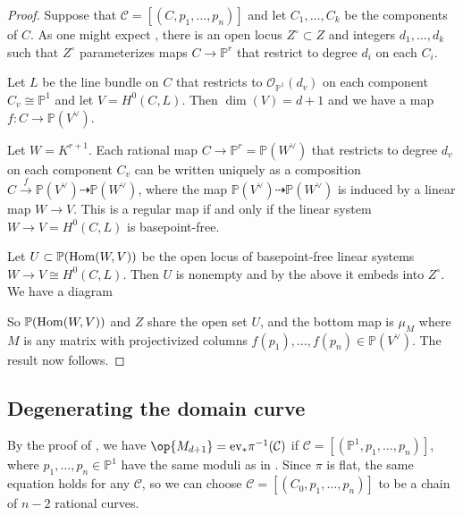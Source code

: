 \documentclass[12pt]{amsart}
\newcommand{\mb}{\mathbb}
\newcommand{\mc}{\mathcal}
\newcommand{\ms}{\mathscr}
\newcommand{\ev}{{\rm ev}}
\theoremstyle{plain}
\theoremstyle{definition}
\theoremstyle{remark}
\begin{document}
\begin{proof}
Suppose that $\mathcal{C}=[(C,p_1,\ldots,p_n)]$ and let $C_1, \ldots, C_k$ be the components of $C$. As one might expect \cite[Section 4.1]{Conformal}, there is an open locus $Z^\circ \subset Z$ and integers $d_1, \ldots, d_k$ such that $Z^\circ$ parameterizes maps $C \to \mb{P}^r$ that restrict to degree $d_i$ on each $C_i$.

Let $L$ be the line bundle on $C$ that restricts to $\ms{O}_{\mb{P}^1}(d_v)$ on each component $C_v\cong \mb{P}^1$ and let $V = H^0(C, L)$. Then $\dim(V) = d+1$ and we have a map $f: C\to \mb{P}(V^{\vee})$. 

Let $W = K^{r+1}$. Each rational map $C\to \mb{P}^r = \mb{P}(W^\vee)$ that restricts to degree $d_v$ on each component $C_v$ can be written uniquely as a composition $C \xrightarrow{f} \mb{P}(V^{\vee})\dashrightarrow \mb{P}(W^\vee)$, where the map $\mb{P}(V^{\vee})\dashrightarrow \mb{P}(W^\vee)$ is induced by a linear map $W \to V$. This is a regular map if and only if the linear system $W\to V = H^0(C, L)$ is basepoint-free.

Let $U\subset \mb{P}({\rm Hom}(W,V))$ be the open locus of basepoint-free linear systems $W\to V\cong H^0(C,L)$. Then $U$ is nonempty and by the above it embeds into $Z^\circ$. We have a diagram
\begin{center}
\end{center}
So $\mb{P}({\rm Hom}(W, V))$ and $Z$ share the open set $U$, and the bottom map is $\mu_M$ where $M$ is any matrix with projectivized columns $f(p_1), \ldots, f(p_n) \in \mb{P}(V^\vee)$. The result now follows.
\end{proof}

\subsection{Degenerating the domain curve}
\label{DTDC}
By the proof of , we have $\op{M_{d+1}}=\ev_*\pi^{-1}(\mc{C})$ if $\mc{C} = [(\mb{P}^1, p_1, \ldots, p_n)]$, where $p_1, \ldots, p_n \in \mb{P}^1$ have the same moduli as in .
Since $\pi$ is flat, the same equation holds for any $\mc{C}$, so we can choose $\mc{C} = [(C_0,p_1,\ldots,p_n)]$ to be a chain of $n-2$ rational curves. 
\end{document}
